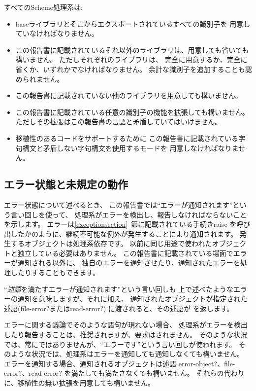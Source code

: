 すべてのScheme処理系は:
\begin{itemize}

\item baseライブラリとそこからエクスポートされているすべての識別子を
用意していなければなりません。

\item この報告書に記載されているそれ以外のライブラリは、用意しても省いても構いません。
ただしそれぞれのライブラリは、
完全に用意するか、完全に省くか、いずれかでなければなりません。
余計な識別子を追加することも認められません。

\item この報告書に記載されていない他のライブラリを用意しても構いません。

\item この報告書に記載されている任意の識別子の機能を拡張しても構いません。
ただしその拡張はこの報告書の言語と矛盾していてはいけません。

\item 移植性のあるコードをサポートするために
この報告書に記載されている字句構文と矛盾しない字句構文を使用するモードを
用意しなければなりません。
\end{itemize}

\subsection{エラー状態と未規定の動作}
\label{errorsituations}

エラー状態について述べるとき、
この報告書では``エラーが通知されます''という言い回しを使って、
処理系がエラーを検出し、報告しなければならないことを示します。
エラーは\ref{exceptionsection}~節に記載されている手続き{\cf raise}
を呼び出したかのように、継続不可能な例外が発生することにより通知されます。
発生するオブジェクトは処理系依存です。
以前に同じ用途で使われたオブジェクトと独立している必要はありません。
この報告書に記載されている場面でエラーが通知される以外に、
独自のエラーを通知させたり、通知されたエラーを処理したりすることもできます。

``{\em 述語}を満たすエラーが通知されます''という言い回しも
上で述べたようなエラーの通知を意味しますが、それに加え、
通知されたオブジェクトが指定された述語({\cf file-error?}または{\cf read-error?})
に渡されると、その述語が \schtrue{} を返します。

\vest エラーに関する議論でそのような語句が現れない場合、
処理系がエラーを検出したり報告することは、推奨されますが、要求はされません。
そのような状況では、常にではありませんが、``エラーです''という言い回しが使われます。
そのような状況では、処理系はエラーを通知しても通知しなくても構いません。
エラーを通知する場合、通知されるオブジェクトは述語
{\cf error-object?}、{\cf file-error?}、{\cf read-error?}
を満たしても満たさなくても構いません。
それらの代わりに、移植性の無い拡張を用意しても構いません。

